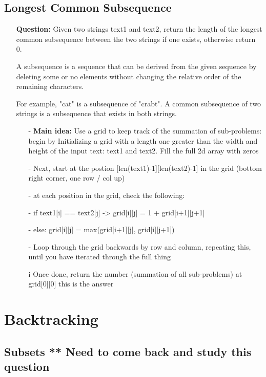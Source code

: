 \documentclass[12pt]{article}
\begin{document}
\subsection{Longest Common Subsequence}
\begin{enumerate}
  \item[] \textbf{Question:} Given two strings text1 and text2, return the length of the longest common subsequence between the two strings if one exists, otherwise return 0.

A subsequence is a sequence that can be derived from the given sequence by deleting some or no elements without changing the relative order of the remaining characters.

For example, "cat" is a subsequence of "crabt".
A common subsequence of two strings is a subsequence that exists in both strings.

    \begin{enumerate}
      \item[-] \textbf{Main idea:} Use a grid to keep track of the summation of sub-problems: begin by Initializing a grid with a length one greater than the width and height of the input text: text1 and text2. Fill the full 2d array with zeros
      \item[-] Next, start at the postion [len(text1)-1][len(text2)-1] in the grid (bottom right corner, one row / col up)
      \item[-] at each position in the grid, check the following:
      \item[-] if text1[i] == text2[j] -> grid[i][j] = 1 + grid[i+1][j+1] 
      \item[-] else: grid[i][j] = max(grid[i+1][j], grid[i][j+1])
      \item[-] Loop through the grid backwards by row and column, repeating this, until you have iterated through the full thing
      \item[i] Once done, return the number (summation of all sub-problems) at grid[0][0] this is the answer
    \end{enumerate}
\end{enumerate}



\section{Backtracking}
\subsection{Subsets ** Need to come back and study this question}
\end{document}
